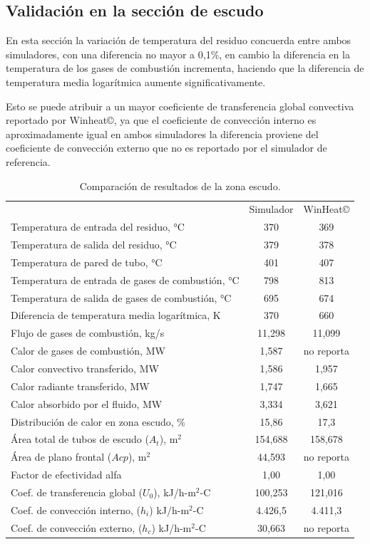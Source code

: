 \subsection{Validación en la sección de escudo}
\par En esta sección la variación de temperatura del residuo concuerda entre ambos simuladores, con una diferencia no mayor a 0,1\%, en cambio la diferencia en la temperatura de los gases de combustión incrementa, haciendo que la diferencia de temperatura media logarítmica aumente significativamente.
\par Esto se puede atribuir a un mayor coeficiente de transferencia global convectiva reportado por Winheat\copyright, ya que el coeficiente de convección interno es aproximadamente igual en ambos simuladores la diferencia proviene del coeficiente de convección externo que no es reportado por el simulador de referencia.
\begin{table}[H] \begin{center}
\caption[Resultados de la zona escudo]{Comparación de resultados de la zona escudo.}
\label{tbl:compara-ze} \begin{tabular}{l|c|c}
	& Simulador & WinHeat\copyright \\
Temperatura de entrada del residuo, °C	& 370 & 369	\\
Temperatura de salida del residuo, °C	& 379 & 378	\\
Temperatura de pared de tubo, °C		& 401 & 407	\\
Temperatura de entrada de gases de combustión, °C	& 798 & 813	\\
Temperatura de salida de gases de combustión, °C	& 695 & 674	\\
Diferencia de temperatura media logarítmica, K	& 370 & 660 \\
\hline
Flujo de gases de combustión, kg/s	& 11,298 & 11,099	\\
Calor de gases de combustión, MW	& 1,587 & no reporta \\
Calor convectivo transferido, MW	& 1,586 & 1,957	\\
Calor radiante transferido, MW		& 1,747 & 1,665	\\
Calor absorbido por el fluido, MW	& 3,334 & 3,621	\\
Distribución de calor en zona escudo, \%& 15,86 &  17,3 \\
\hline
Área total de tubos de escudo ($A_t$), m$^2$& 154,688 & 158,678 \\
Área de plano frontal ($Acp$), m$^2$	   & 44,593 & no reporta \\
Factor de efectividad alfa			       & 1,00 & 1,00 \\
\hline
Coef. de transferencia global ($U_0$), kJ/h-m$^2$-C	& 100,253  & 121,016 \\
Coef. de convección interno, ($h_i$) kJ/h-m$^2$-C	& 4.426,5 & 4.411,3 \\
Coef. de convección externo, ($h_c$) kJ/h-m$^2$-C	& 30,663 & no reporta \\
\end{tabular} \end{center} \end{table}

